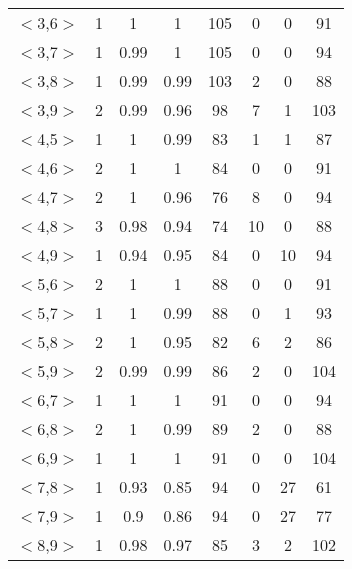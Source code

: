 \documentclass[11pt,letterpaper,oneside]{article}
\begin{document}
\begin{table}[th]
\begin{tabular*}{\textwidth}{@{\extracolsep{\fill}}cccccccc}
$<$3,6$>$ & 1 & 1 & 1 & 105 & 0 & 0 & 91\\
$<$3,7$>$ & 1 & 0.99 & 1 & 105 & 0 & 0 & 94\\
$<$3,8$>$ & 1 & 0.99 & 0.99 & 103 & 2 & 0 & 88\\
$<$3,9$>$ & 2 & 0.99 & 0.96 & 98 & 7 & 1 & 103\\
$<$4,5$>$ & 1 & 1 & 0.99 & 83 & 1 & 1 & 87\\
$<$4,6$>$ & 2 & 1 & 1 & 84 & 0 & 0 & 91\\
$<$4,7$>$ & 2 & 1 & 0.96 & 76 & 8 & 0 & 94\\
$<$4,8$>$ & 3 & 0.98 & 0.94 & 74 & 10 & 0 & 88\\
$<$4,9$>$ & 1 & 0.94 & 0.95 & 84 & 0 & 10 & 94\\
$<$5,6$>$ & 2 & 1 & 1 & 88 & 0 & 0 & 91\\
$<$5,7$>$ & 1 & 1 & 0.99 & 88 & 0 & 1 & 93\\
$<$5,8$>$ & 2 & 1 & 0.95 & 82 & 6 & 2 & 86\\
$<$5,9$>$ & 2 & 0.99 & 0.99 & 86 & 2 & 0 & 104\\
$<$6,7$>$ & 1 & 1 & 1 & 91 & 0 & 0 & 94\\
$<$6,8$>$ & 2 & 1 & 0.99 & 89 & 2 & 0 & 88\\
$<$6,9$>$ & 1 & 1 & 1 & 91 & 0 & 0 & 104\\
$<$7,8$>$ & 1 & 0.93 & 0.85 & 94 & 0 & 27 & 61\\
$<$7,9$>$ & 1 & 0.9 & 0.86 & 94 & 0 & 27 & 77\\
$<$8,9$>$ & 1 & 0.98 & 0.97 & 85 & 3 & 2 & 102\\
\hline
\end{tabular*}
\label{tab1}
\end{table}
\end{document}
